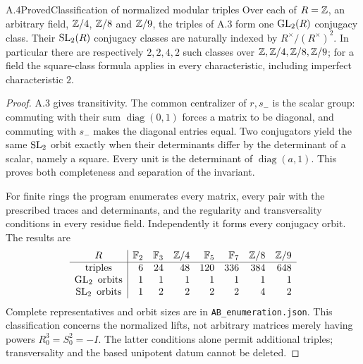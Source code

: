\begin{statement}{A.4}{Proved}{Classification of normalized modular triples}
Over each of $R=\mathbb Z$, an arbitrary field, $\mathbb Z/4$, $\mathbb Z/8$ and $\mathbb Z/9$,
the triples of A.3 form one $\operatorname{GL}_2(R)$ conjugacy class. Their
$\operatorname{SL}_2(R)$ conjugacy classes are naturally indexed by
$R^\times/(R^\times)^2$. In particular there are respectively
$2,2,4,2$ such classes over $\mathbb Z,\mathbb Z/4,\mathbb Z/8,\mathbb Z/9$; for a field the
square-class formula applies in every characteristic, including
imperfect characteristic $2$.
\end{statement}
\begin{proof}
A.3 gives transitivity. The common centralizer of $r,s_-$ is the
scalar group: commuting with their sum $\operatorname{diag}(0,1)$
forces a matrix to be diagonal, and commuting with $s_-$ makes the
diagonal entries equal. Two conjugators yield the same $\operatorname{SL}_2$ orbit
exactly when their determinants differ by the determinant of a
scalar, namely a square. Every unit is the determinant of
$\operatorname{diag}(a,1)$. This proves both completeness and
separation of the invariant.

For finite rings the program enumerates every matrix, every pair with
the prescribed traces and determinants, and the regularity and
transversality conditions in every residue field. Independently it
forms every conjugacy orbit. The results are
\[
\begin{array}{c|rrrrrrr}
R&\mathbb F_2&\mathbb F_3&\mathbb Z/4&\mathbb F_5&\mathbb F_7&\mathbb Z/8&\mathbb Z/9\\\hline
\text{triples}&6&24&48&120&336&384&648\\
\operatorname{GL}_2\text{ orbits}&1&1&1&1&1&1&1\\
\operatorname{SL}_2\text{ orbits}&1&2&2&2&2&4&2
\end{array}
\]
Complete representatives and orbit sizes are in
\texttt{AB\_enumeration.json}. This classification concerns the
normalized lifts, not arbitrary matrices merely having powers
$R_0^3=S_0^2=-I$. The latter conditions alone permit additional
triples; transversality and the based unipotent datum cannot be deleted.
\end{proof}

